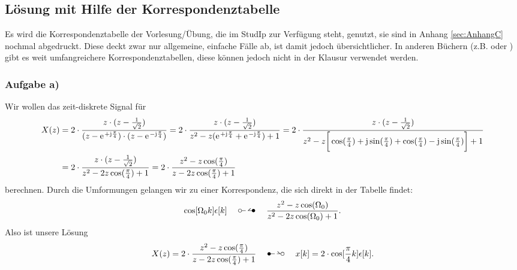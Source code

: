 \documentclass[11pt,a4paper,DIV=12]{scrartcl}
\begin{document}
\subsection{Lösung mit Hilfe der Korrespondenztabelle}
Es wird die Korrespondenztabelle der Vorlesung/Übung, die im StudIp zur Verfügung steht, genutzt, sie sind in Anhang \ref{sec:AnhangC} nochmal abgedruckt. Diese deckt zwar nur allgemeine, einfache Fälle ab, ist damit jedoch übersichtlicher. In anderen Büchern (z.B. \cite[Kap. 21, S. 1128-1130]{Bronstein2015} oder \cite[S. 237-238]{UlrichWeber2017} ) gibt es weit umfangreichere Korrespondenztabellen, diese können jedoch nicht in der Klausur verwendet werden.
\subsubsection{Aufgabe a)}
Wir wollen das zeit-diskrete Signal für
\begin{align}
	X(z)&=2\cdot\frac{z\cdot(z-\frac{1}{\sqrt{2}})}{(z-\e^{+\im\frac{\pi}{4}})\cdot(z-\e^{-\im\frac{\pi}{4}})}=2\cdot\frac{z\cdot(z-\frac{1}{\sqrt{2}})}{z^2-z(\e^{+\im\frac{\pi}{4}}+\e^{-\im\frac{\pi}{4}})+1}=2\cdot\frac{z\cdot(z-\frac{1}{\sqrt{2}})}{z^2-z\bigg[\cos(\frac{\pi}{4})+\im\sin(\frac{\pi}{4})+\cos(\frac{\pi}{4})-\im\sin(\frac{\pi}{4})\bigg ]+1}\nonumber\\
	&=2\cdot\frac{z\cdot(z-\frac{1}{\sqrt{2}})}{z^2-2z\cos(\frac{\pi}{4})+1}=2\cdot\frac{z^2-z\cos(\frac{\pi}{4})}{z-2z\cos(\frac{\pi}{4})+1}
\end{align}
berechnen.
Durch die Umformungen gelangen wir zu einer Korrespondenz, die sich direkt in der Tabelle findet:
\begin{align}
	\cos[\Omega_0k]\epsilon[k]\quad\ztransf\quad\frac{z^2-z\cos(\Omega_0)}{z^2-2z\cos(\Omega_0)+1}.
\end{align}
Also ist unsere Lösung
\begin{align}
	X(z)=2\cdot\frac{z^2-z\cos(\frac{\pi}{4})}{z-2z\cos(\frac{\pi}{4})+1}\quad\Ztransf\quad x[k]=2\cdot\cos[\frac{\pi}{4}k]\epsilon[k].
\end{align}
\end{document}
